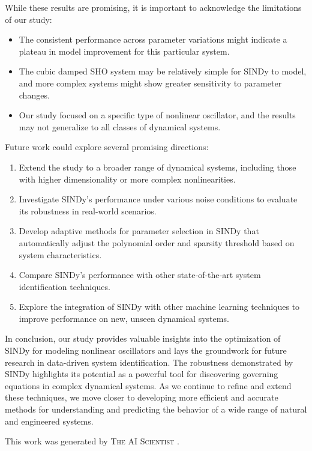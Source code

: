 \documentclass{article} %
\begin{document}
While these results are promising, it is important to acknowledge the limitations of our study:

\begin{itemize}
    \item The consistent performance across parameter variations might indicate a plateau in model improvement for this particular system.
    \item The cubic damped SHO system may be relatively simple for SINDy to model, and more complex systems might show greater sensitivity to parameter changes.
    \item Our study focused on a specific type of nonlinear oscillator, and the results may not generalize to all classes of dynamical systems.
\end{itemize}

Future work could explore several promising directions:

\begin{enumerate}
    \item Extend the study to a broader range of dynamical systems, including those with higher dimensionality or more complex nonlinearities.
    \item Investigate SINDy's performance under various noise conditions to evaluate its robustness in real-world scenarios.
    \item Develop adaptive methods for parameter selection in SINDy that automatically adjust the polynomial order and sparsity threshold based on system characteristics.
    \item Compare SINDy's performance with other state-of-the-art system identification techniques.
    \item Explore the integration of SINDy with other machine learning techniques to improve performance on new, unseen dynamical systems.
\end{enumerate}

In conclusion, our study provides valuable insights into the optimization of SINDy for modeling nonlinear oscillators and lays the groundwork for future research in data-driven system identification. The robustness demonstrated by SINDy highlights its potential as a powerful tool for discovering governing equations in complex dynamical systems. As we continue to refine and extend these techniques, we move closer to developing more efficient and accurate methods for understanding and predicting the behavior of a wide range of natural and engineered systems.

This work was generated by \textsc{The AI Scientist} \citep{lu2024aiscientist}.



\end{document}
